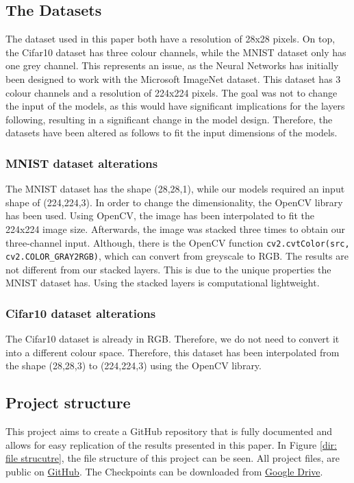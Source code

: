 \documentclass[conference]{IEEEtran}
\begin{document}
\subsection{The Datasets}\label{ID}

The dataset used in this paper both have a resolution of 28x28 pixels. On top, the Cifar10 dataset has three colour channels, while the MNIST dataset only has one grey channel.
This represents an issue, as the Neural Networks has initially been designed to work with the Microsoft ImageNet dataset. This dataset has 3 colour channels and a resolution of 224x224 pixels.
The goal was not to change the input of the models, as this would have significant implications for the layers following, resulting in a significant change in the model design.
Therefore, the datasets have been altered as follows to fit the input dimensions of the models.

\subsubsection{MNIST dataset alterations}
The MNIST dataset has the shape (28,28,1), while our models required an input shape of (224,224,3). 
In order to change the dimensionality, the OpenCV library has been used. Using OpenCV, the image has been interpolated to fit the 224x224 image size. 
Afterwards, the image was stacked three times to obtain our three-channel input. Although, there is the OpenCV function \verb|cv2.cvtColor(src, cv2.COLOR_GRAY2RGB)|, 
which can convert from greyscale to RGB. The results are not different from our stacked layers. 
This is due to the unique properties the MNIST dataset has. Using the stacked layers is computational lightweight.

\subsubsection{Cifar10 dataset alterations}
The Cifar10 dataset is already in RGB. Therefore, we do not need to convert it into a different colour space. 
Therefore, this dataset has been interpolated from the shape (28,28,3) to (224,224,3) using the OpenCV library.

\subsection{Project structure}
This project aims to create a GitHub repository that is fully documented and allows for easy replication of the results presented in this paper. 
In Figure \ref{dir: file strucutre}, the file structure of this project can be seen.
All project files, are public on \href{https://github.com/devasworski/Deeper-Networks-for-Image-Classification}{GitHub}.
The Checkpoints can be downloaded from \href{https://drive.google.com/drive/folders/1fXxzepBOfI-so3I4ZbZv16Pux7InrMIv?usp=sharing}{Google Drive}.
\end{document}
